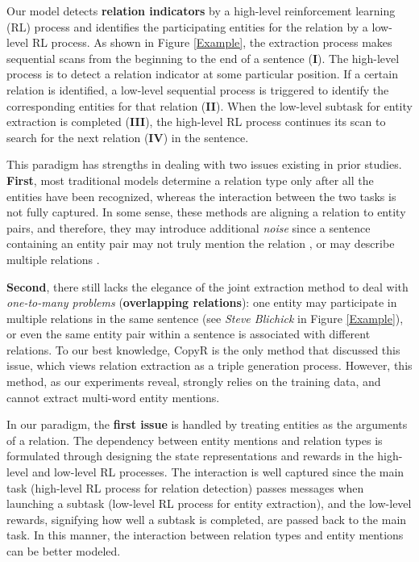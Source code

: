\documentclass[letterpaper]{article} %
\theoremstyle{definition}
\begin{document}
Our model detects {\bf relation indicators} by a high-level reinforcement learning (RL) process and identifies the participating entities for the relation by a low-level RL process.  
As shown in Figure \ref{Example},
the extraction process makes sequential scans from the beginning to the end of a sentence (\textbf{I}). The high-level process is to detect a relation indicator at some particular position. 
If a certain relation is identified, a low-level sequential process is triggered to identify the corresponding entities for that relation (\textbf{II}). 
When the low-level subtask for entity extraction is completed (\textbf{III}), the high-level RL process continues its scan to search for the next relation (\textbf{IV}) in the sentence.

This paradigm has strengths in dealing with two issues existing in prior studies. 
\textbf{First}, most traditional models \cite{gormley2015improved,hoffmann2011knowledge,miwa2016end} determine a relation type only after all the entities have been recognized, whereas the interaction between the two tasks is not fully captured. In some sense, these methods are aligning a relation to entity pairs, and therefore, they may introduce additional \textit{noise} since a sentence containing an entity pair may not truly mention the relation \cite{zhang2013towards}, or may describe multiple relations \cite{takamatsu2012reducing}. 

\textbf{Second}, there still lacks the elegance of the joint extraction method to deal with {\it one-to-many problems} (\textbf{overlapping relations}): one entity may participate in multiple relations in the same sentence  (see \textit{Steve Blichick} in Figure \ref{Example}), or even the same entity pair within a sentence is associated with different relations. %
To our best knowledge, CopyR \cite{zeng2018extracting} is the only method that discussed this issue, which views relation extraction as a triple generation process. However, this method, as our experiments reveal, strongly relies on the training data, and cannot extract multi-word entity mentions. 

In our paradigm, the \textbf{first issue} is handled by treating entities as the arguments of a relation.
The dependency between entity mentions and relation types is formulated through designing the state representations and rewards in the high-level and low-level RL processes.
The interaction is well captured since the main task (high-level RL process for relation detection) passes messages when launching a subtask (low-level RL process for entity extraction), and the low-level rewards, signifying how well a subtask is completed, are passed back to the main task. In this manner, the interaction between relation types and entity mentions can be better modeled.
\end{document}
